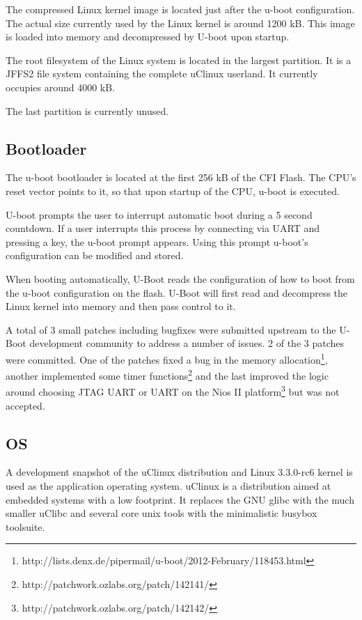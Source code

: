 The compressed Linux kernel image is located just after the u-boot configuration. The actual
size currently used by the Linux kernel is around 1200 kB. This image is loaded into memory
and decompressed by U-boot upon startup.

The root filesystem of the Linux system is located in the largest partition. It is a JFFS2
file system containing the complete uClinux userland. It currently occupies around 4000 kB.

The last partition is currently unused.


\newpage
\subsection{Bootloader}
The u-boot bootloader is located at the first 256 kB of the CFI Flash. The CPU's
reset vector points to it, so that upon startup of the CPU, u-boot is executed.

U-boot prompts the user to interrupt automatic boot during a 5 second countdown. If a
user interrupts this process by connecting via UART and pressing a key, the u-boot
prompt appears. Using this prompt u-boot's configuration can be modified and stored.

When booting automatically, U-Boot reads the configuration of how to boot from the
u-boot configuration on the flash. U-Boot will first read and decompress the Linux
kernel into memory and then pass control to it.

A total of 3 small patches including bugfixes were submitted upstream to the U-Boot development
community to address a number of issues. 2 of the 3 patches were committed. One of the patches
fixed a bug in the memory allocation\footnote{http://lists.denx.de/pipermail/u-boot/2012-February/118453.html},
another implemented some timer functions\footnote{http://patchwork.ozlabs.org/patch/142141/} and the last
improved the logic around choosing JTAG UART or UART on the Nios II platform\footnote{http://patchwork.ozlabs.org/patch/142142/} but was not accepted.


\subsection{OS}
A development snapshot of the uClinux distribution and Linux 3.3.0-rc6 kernel is used as the
application operating system. uClinux is a distribution aimed at embedded systems with a low
footprint. It replaces the GNU glibc with the much smaller uClibc and several core unix tools
with the minimalistic busybox toolsuite.


